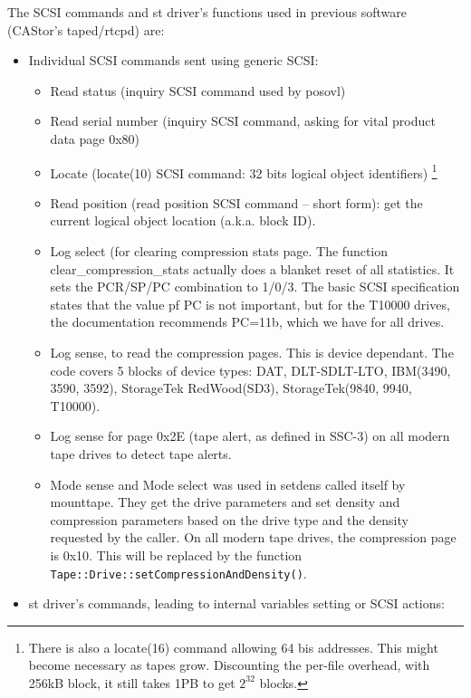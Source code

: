 The SCSI commands and st driver's functions used in previous software (CAStor's taped/rtcpd) are:
\begin{itemize}
\item Individual SCSI commands sent using generic SCSI:
  \begin{itemize}
    \item Read status (inquiry SCSI command used by posovl)
    \item Read serial number (inquiry SCSI command, asking for vital product data page 0x80)
    \item Locate (locate(10) SCSI command: 32 bits logical object identifiers)
                      \footnote{There is also a locate(16) command allowing 64 bis addresses.
                      This might become necessary as tapes grow. Discounting the per-file overhead,
                      with 256kB block, it still takes 1PB to get $2^{32}$ blocks.}
    \item Read position (read position SCSI command -- short form): get the current logical object
          location (a.k.a. block ID).
    \item Log select (for clearing compression stats page. The function clear\_compression\_stats
          actually does a blanket reset of all statistics. It sets the PCR/SP/PC combination
          to 1/0/3. The basic SCSI specification states that the value pf PC is not important,
          but for the T10000 drives, the documentation recommends PC=11b, which we have for all drives.
    \item Log sense, to read the compression pages. This is device dependant. The code covers
          5 blocks of device types: DAT, DLT-SDLT-LTO, IBM(3490, 3590, 3592), StorageTek RedWood(SD3),
          StorageTek(9840, 9940, T10000).
    \item Log sense for page 0x2E (tape alert, as defined in SSC-3) on all modern tape drives to detect tape alerts.
    \item Mode sense and Mode select was used in setdens called itself by mounttape.
          They get the drive parameters and set density and compression parameters based
          on the drive type and the density requested by the caller. On all modern tape drives,
          the compression page is 0x10. This will be replaced by the function \verb#Tape::Drive::setCompressionAndDensity()#.
  \end{itemize}
\item st driver's commands, leading to internal variables setting or SCSI actions:
  \begin{itemize}

\end{itemize}
\end{itemize}
